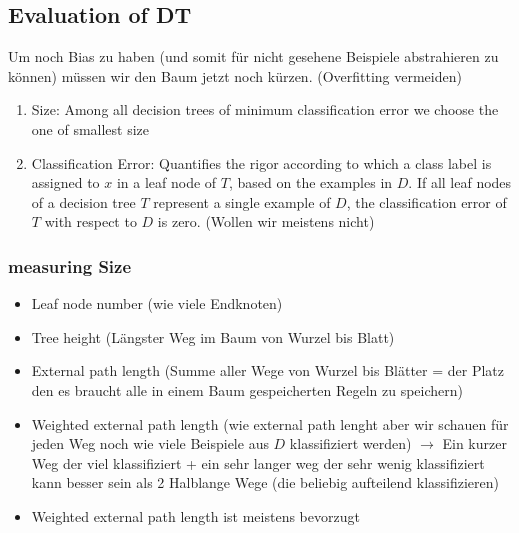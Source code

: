 \documentclass[11pt,a4paper]{article}
\begin{document}
\begin{flushleft}
\subsection{Evaluation of DT}
Um noch Bias zu haben (und somit für nicht gesehene Beispiele abstrahieren zu können) müssen wir den Baum jetzt noch kürzen. (Overfitting vermeiden)
\begin{enumerate}
\item Size: Among all decision trees of minimum classification error we choose the
one of smallest size
\item Classification Error: Quantifies the rigor according to which a class label is assigned to $x$ in a leaf node of $T$, based on the examples in $D$. If all leaf nodes of a decision tree $T$ represent a single example of $D$, the classification error of $T$ with respect to $D$ is zero. (Wollen wir meistens nicht)
\end{enumerate}
\subsubsection{measuring Size}
\begin{itemize}
\item Leaf node number (wie viele Endknoten)
\item Tree height (Längster Weg im Baum von Wurzel bis Blatt)
\item External path length (Summe aller Wege von Wurzel bis Blätter = der Platz den es braucht alle in einem Baum gespeicherten Regeln zu speichern)
\item Weighted external path length (wie external path lenght aber wir schauen für jeden Weg noch wie viele Beispiele aus $D$ klassifiziert werden) $\rightarrow $ Ein kurzer Weg der viel klassifiziert  + ein sehr langer weg der sehr wenig klassifiziert kann besser sein als 2 Halblange Wege (die beliebig aufteilend klassifizieren)
\item Weighted external path length ist meistens bevorzugt
\end{itemize}

\end{flushleft}
\end{document}
